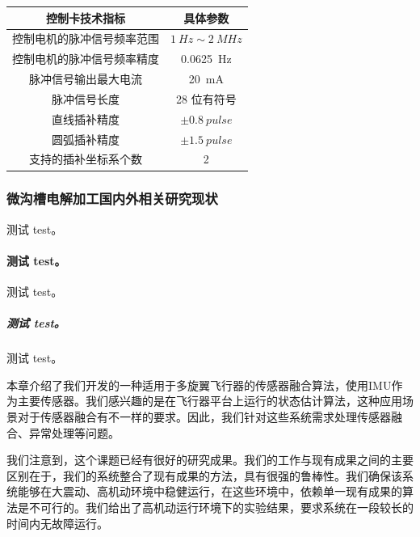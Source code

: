 \documentclass[
  type=master
]{gdutthesis}
\begin{document}
\begin{table}
  \label{tab:example}
  \begin{tabular}{cc}
    \toprule
    控制卡技术指标              & 具体参数                      \\
    \midrule
    控制电机的脉冲信号频率范围  & $\SI{1}{Hz}\sim\SI{2}{MHz}$ \\
    控制电机的脉冲信号频率精度  & \SI{0.0625}{Hz}              \\
    脉冲信号输出最大电流        & \SI{20}{mA}                  \\
    脉冲信号长度                & 28 位有符号                   \\
    直线插补精度                & $\pm \SI{0.8}{pulse}$        \\
    圆弧插补精度                & $\pm \SI{1.5}{pulse}$        \\
    支持的插补坐标系个数        & 2                             \\
    \bottomrule
  \end{tabular}
\end{table}


\subsubsection{微沟槽电解加工国内外相关研究现状}
测试 test。
\paragraph{测试 test。}
测试 test。
\subparagraph{测试 test。}
测试 test\cite{woerdelun2012jingji}。

本章介绍了我们开发的一种适用于多旋翼飞行器的传感器融合算法，使用IMU作为主要传感器。我们感兴趣的是在飞行器平台上运行的状态估计算法，这种应用场景对于传感器融合有不一样的要求。因此，我们针对这些系统需求处理传感器融合、异常处理等问题。\par
我们注意到，这个课题已经有很好的研究成果\cite{mahony2008nonlinear,hua2010attitude,khosravian2016state}。我们的工作与现有成果之间的主要区别在于，我们的系统整合了现有成果的方法，具有很强的鲁棒性。我们确保该系统能够在大震动、高机动环境中稳健运行，在这些环境中，依赖单一现有成果的算法是不可行的。我们给出了高机动运行环境下的实验结果，要求系统在一段较长的时间内无故障运行。\par
\end{document}
